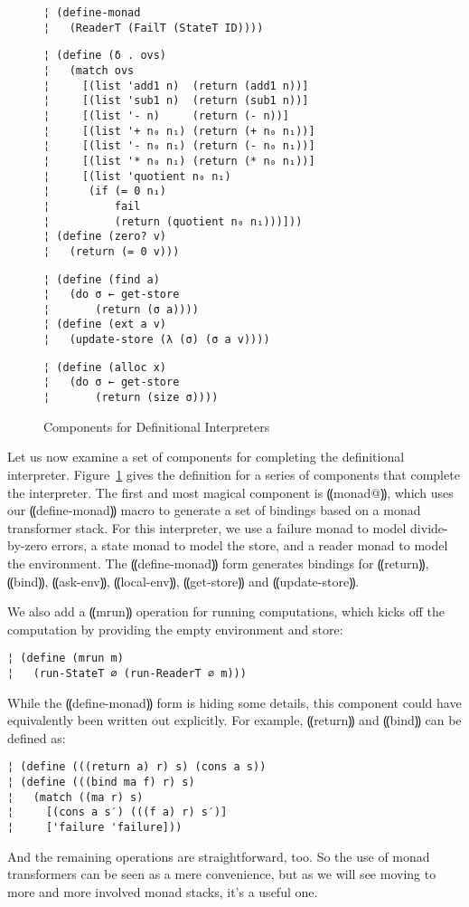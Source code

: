 \begin{figure}
\begin{lstlisting}
¦ (define-monad 
¦   (ReaderT (FailT (StateT ID))))
\end{lstlisting}
\figskip{}
\begin{lstlisting}
¦ (define (δ . ovs)
¦   (match ovs
¦     [(list 'add1 n)  (return (add1 n))]
¦     [(list 'sub1 n)  (return (sub1 n))]
¦     [(list '- n)     (return (- n))]
¦     [(list '+ n₀ n₁) (return (+ n₀ n₁))]
¦     [(list '- n₀ n₁) (return (- n₀ n₁))]
¦     [(list '* n₀ n₁) (return (* n₀ n₁))]
¦     [(list 'quotient n₀ n₁)
¦      (if (= 0 n₁)
¦          fail
¦          (return (quotient n₀ n₁)))]))
¦ (define (zero? v)
¦   (return (= 0 v)))
\end{lstlisting}
\figskip{}
\begin{lstlisting}
¦ (define (find a)
¦   (do σ ← get-store
¦       (return (σ a))))
¦ (define (ext a v) 
¦   (update-store (λ (σ) (σ a v))))
\end{lstlisting}
\figskip{}
\begin{lstlisting}
¦ (define (alloc x)
¦   (do σ ← get-store
¦       (return (size σ))))
\end{lstlisting}
\caption{Components for Definitional Interpreters}
\label{f:concrete-components}
\end{figure}

Let us now examine a set of components for completing the definitional
interpreter.  Figure~\ref{f:concrete-components} gives the definition
for a series of components that complete the interpreter.  The first
and most magical component is ⸨monad@⸩, which uses our
⸨define-monad⸩ macro to generate a set of bindings based on a
monad transformer stack.  For this interpreter, we use a failure monad
to model divide-by-zero errors, a state monad to model the store, and
a reader monad to model the environment.  The ⸨define-monad⸩
form generates bindings for ⸨return⸩, ⸨bind⸩,
⸨ask-env⸩, ⸨local-env⸩, ⸨get-store⸩ and
⸨update-store⸩. 

We also add a ⸨mrun⸩ operation for running computations, which
kicks off the computation by providing the empty environment and
store:
\begin{lstlisting}
¦ (define (mrun m)
¦   (run-StateT ∅ (run-ReaderT ∅ m)))
\end{lstlisting}
While the ⸨define-monad⸩ form is hiding some details, this
component could have equivalently been written out explicitly. For
example, ⸨return⸩ and ⸨bind⸩ can be defined as:
\begin{lstlisting}
¦ (define (((return a) r) s) (cons a s))
¦ (define (((bind ma f) r) s)
¦   (match ((ma r) s)
¦     [(cons a s′) (((f a) r) s′)]
¦     ['failure 'failure]))
\end{lstlisting}
And the remaining operations are straightforward, too.  So the use of
monad transformers can be seen as a mere convenience, but as we will
see moving to more and more involved monad stacks, it's a useful one.

